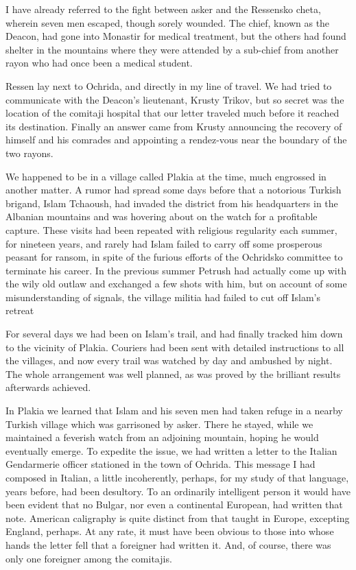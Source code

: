 \documentclass[a5paper,12pt]{book}
\begin{document}
I have already referred to the fight between asker and the Ressensko cheta, wherein seven men escaped, though sorely wounded. The chief, known as the Deacon, had gone into Monastir for medical treatment, but the others had found shelter in the mountains where they were attended by a sub-chief from another rayon who had once been a medical student. 

Ressen lay next to Ochrida, and directly in my line of travel. We had tried to communicate with the Deacon’s lieutenant, Krusty Trikov, but so secret was the location of the comitaji hospital that our letter traveled much before it reached its destination. Finally an answer came from Krusty announcing the recovery of himself and his comrades and appointing a rendez-vous near the boundary of the two rayons. 

We happened to be in a village called Plakia at the time, much engrossed in another matter. A rumor had spread some days before that a notorious Turkish brigand, Islam Tchaoush, had invaded the district from his headquarters in the Albanian mountains and was hovering about on the watch for a profitable capture. These visits had been repeated with religious regularity each summer, for nineteen years, and rarely had Islam failed to carry off some prosperous peasant for ransom, in spite of the furious efforts of the Ochridsko committee to terminate his career. In the previous summer Petrush had actually come up with the wily old outlaw and exchanged a few shots with him, but on account of some misunderstanding of signals, the village militia had failed to cut off Islam’s retreat 

For several days we had been on Islam’s trail, and had finally tracked him down to the vicinity of Plakia. Couriers had been sent with detailed instructions to all the villages, and now every trail was watched by day and ambushed by night. The whole arrangement was well planned, as was proved by the brilliant results afterwards achieved. 

In Plakia we learned that Islam and his seven men had taken refuge in a nearby Turkish village which was garrisoned by asker. There he stayed, while we maintained a feverish watch from an adjoining mountain, hoping he would eventually emerge. To expedite the issue, we had written a letter to the Italian Gendarmerie officer stationed in the town of Ochrida. This message I had composed in Italian, a little incoherently, perhaps, for my study of that language, years before, had been desultory. To an ordinarily intelligent person it would have been evident that no Bulgar, nor even a continental European, had written that note. American caligraphy is quite distinct from that taught in Europe, excepting England, perhaps. At any rate, it must have been obvious to those into whose hands the letter fell that a foreigner had written it. And, of course, there was only one foreigner among the comitajis. 
\end{document}
